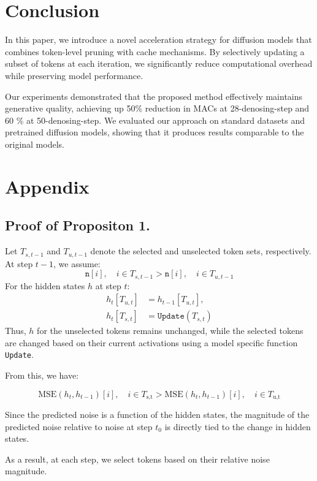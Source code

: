 \documentclass[10pt]{article}
\begin{document}
\section{Conclusion }
In this paper, we introduce a novel acceleration strategy for diffusion models that combines token-level pruning with cache mechanisms. By selectively updating a subset of tokens at each iteration, we significantly reduce computational overhead while preserving model performance. 

Our experiments demonstrated that the proposed method effectively maintains generative quality, achieving up 50\% reduction in MACs at 28-denosing-step and 60 \% at 50-denosing-step. We evaluated our approach on standard datasets and pretrained diffusion models, showing that it produces results comparable to the original models.







\appendix
\section{Appendix}

\subsection{Proof of Propositon 1.}
Let $T_{s,t-1}$ and $T_{u,t-1}$ denote the selected and unselected token sets, respectively. At step $t-1$, we assume:
\vspace{-5pt}
\[
\texttt{n}[i], \quad i \in T_{s,t-1} > \texttt{n}[i], \quad i \in T_{u,t-1}
\]
\vspace{-3pt}
For the hidden states $h$ at step $t$:
\vspace{-0.5pt}
\begin{align*}
    h_t[T_{{u,t}}] &= h_{t-1}[T_{{u,t}}], \\
    h_t[T_{{s,t}}] &= \texttt{Update}(T_{{s,t}})
\end{align*}
\vspace{-2pt}
Thus, $h$ for the unselected tokens remains unchanged, while the selected tokens are changed based on their current activations using a model specific function \texttt{Update}.

\vspace{-2pt}
From this, we have:

\vspace{-10pt}
\[
\text{MSE}(h_t, h_{t-1})[i], \quad i \in T_{\text{s,t}} > \text{MSE}(h_t, h_{t-1})[i], \quad i \in T_{\text{u,t}}
\]

\vspace{-5pt}
Since the predicted noise is a function of the hidden states, the magnitude of the predicted noise relative to noise at step $t_0$ is directly tied to the change in hidden states.


As a result, at each step, we select tokens based on their relative noise magnitude.
\end{document}
